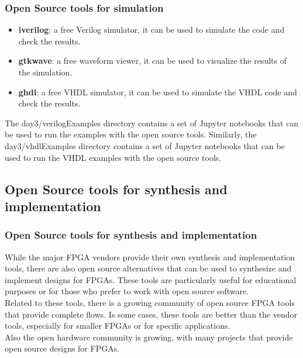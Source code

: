 \documentclass{beamer}
\begin{document}
\begin{frame}\frametitle{Open Source tools for simulation}
\begin{itemize}
	\item \textbf{iverilog}: a free Verilog simulator, it can be used to simulate the code and check the results.
	\vspace{0.3cm}
	\item \textbf{gtkwave}: a free waveform viewer, it can be used to visualize the results of the simulation.
	\vspace{0.3cm}
	\item \textbf{ghdl}: a free VHDL simulator, it can be used to simulate the VHDL code and check the results.
\end{itemize}
\vspace{0.3cm}
The day3/verilogExamples directory contains a set of 
Jupyter notebooks that can be used to run the examples
with the open source tools.
\vspace{0.3cm}
Similarly, the day3/vhdlExamples directory contains a set
of Jupyter notebooks that can be used to run the VHDL examples with the open source tools.
\end{frame}

\subsection{Open Source tools for synthesis and implementation}

\begin{frame}\frametitle{Open Source tools for synthesis and implementation}
While the major FPGA vendors provide their own synthesis 
and implementation tools, there are also open source alternatives 
that can be used to synthesize and implement designs 
for FPGAs. These tools are particularly useful for 
educational purposes or for those who prefer to work 
with open source software. \\
\vspace{0.5cm}
Related to these tools, there is a growing community of
open source FPGA tools that provide complete flows. Is 
some cases, these tools are better than the vendor tools,
especially for smaller FPGAs or for specific applications. \\
\vspace{0.5cm}
Also the open hardware community is growing, with many
projects that provide open source designs for FPGAs.

\end{frame}
\end{document}
